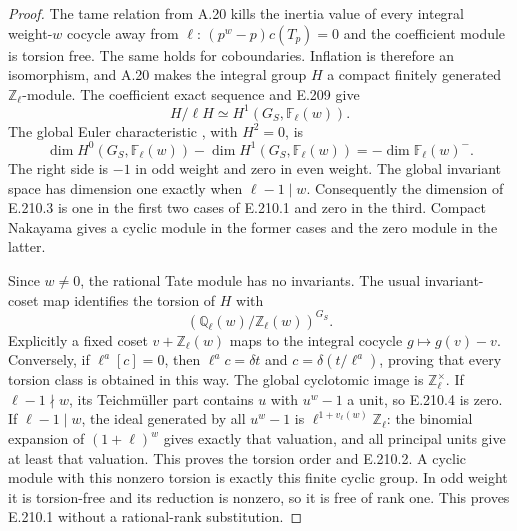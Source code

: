 \begin{proof}
The tame relation from A.20 kills the inertia value of
every integral weight-$w$ cocycle away from $\ell$:
$(p^w-p)c(T_p)=0$ and the coefficient module is torsion
free. The same holds for coboundaries. Inflation is
therefore an isomorphism, and A.20 makes the integral
group $H$ a compact finitely generated $\mathbb Z_\ell$-module.
The coefficient exact sequence and E.209 give
\[
 H/\ell H\simeq H^1(G_S,\mathbb F_\ell(w)).                    \tag{E.210.3}
\]
The global Euler characteristic
\citep[I.5.1, p.~67]{CohMilneADT}, with $H^2=0$, is
\[
 \dim H^0(G_S,\mathbb F_\ell(w))
 -\dim H^1(G_S,\mathbb F_\ell(w))
 =-\dim\mathbb F_\ell(w)^-.
\]
The right side is $-1$ in odd weight and zero in even
weight. The global invariant space has dimension one
exactly when $\ell-1\mid w$. Consequently the dimension
of E.210.3 is one in the first two cases of E.210.1
and zero in the third. Compact Nakayama gives a cyclic
module in the former cases and the zero module in the latter.

Since $w\ne0$, the rational Tate module has no invariants.
The usual invariant-coset map identifies the torsion of
$H$ with
\[
 (\mathbb Q_\ell(w)/\mathbb Z_\ell(w))^{G_S}.
                                                               \tag{E.210.4}
\]
Explicitly a fixed coset $v+\mathbb Z_\ell(w)$ maps to
the integral cocycle $g\mapsto g(v)-v$. Conversely, if
$\ell^a[c]=0$, then $\ell^ac=\delta t$ and
$c=\delta(t/\ell^a)$, proving that every torsion class
is obtained in this way. The global cyclotomic image
is $\mathbb Z_\ell^\times$. If $\ell-1\nmid w$, its
Teichm\"uller part contains $u$ with $u^w-1$ a unit,
so E.210.4 is zero. If $\ell-1\mid w$, the ideal
generated by all $u^w-1$ is
$\ell^{1+v_\ell(w)}\mathbb Z_\ell$: the binomial
expansion of $(1+\ell)^w$ gives exactly that valuation,
and all principal units give at least that valuation.
This proves the torsion order and E.210.2. A cyclic
module with this nonzero torsion is exactly this finite
cyclic group. In odd weight it is torsion-free and its
reduction is nonzero, so it is free of rank one.
This proves E.210.1 without a rational-rank substitution.


\end{proof}

